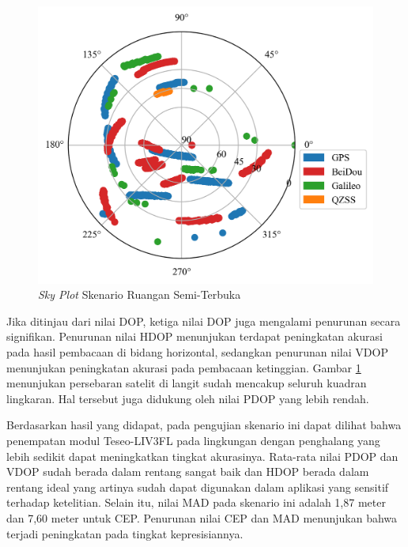 \begin{figure}[H]
	\centering
	\captionsetup{justification=centering}
	\includegraphics[width=12cm]{contents/chapter-4/3-skenario-semioutdoor/sky_plot.png}
	\caption{\textit{Sky Plot} Skenario Ruangan Semi-Terbuka}
	\label{Fig: semioutdoor-sky_plot}
\end{figure}


Jika ditinjau dari nilai DOP, ketiga nilai DOP juga mengalami penurunan secara signifikan. Penurunan nilai HDOP menunjukan terdapat peningkatan akurasi pada hasil pembacaan di bidang horizontal, sedangkan penurunan nilai VDOP menunjukan peningkatan akurasi pada pembacaan ketinggian. Gambar \ref{Fig: semioutdoor-sky_plot} menunjukan persebaran satelit di langit sudah mencakup seluruh kuadran lingkaran. Hal tersebut juga didukung oleh nilai PDOP yang lebih rendah.

Berdasarkan hasil yang didapat, pada pengujian skenario ini dapat dilihat bahwa penempatan modul Teseo-LIV3FL pada lingkungan dengan penghalang yang lebih sedikit dapat meningkatkan tingkat akurasinya. Rata-rata nilai PDOP dan VDOP sudah berada dalam rentang sangat baik dan HDOP berada dalam rentang ideal yang artinya sudah dapat digunakan dalam aplikasi yang sensitif terhadap ketelitian. Selain itu, nilai MAD pada skenario ini adalah 1,87 meter dan 7,60 meter untuk CEP. Penurunan nilai CEP dan MAD menunjukan bahwa terjadi peningkatan pada tingkat kepresisiannya.

